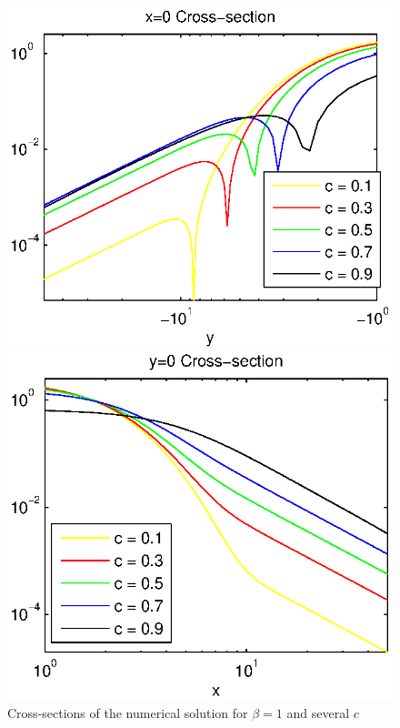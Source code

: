 \documentclass[leqno,11pt]{book}
\begin{document}
\begin{figure}[ht]
\begin{minipage}[b]{0.5\linewidth}
	\end{minipage}
	\begin{minipage}[b]{0.5\linewidth}
		\raggedleft
		\includegraphics[width=\linewidth]{cross-sections/c=01__09beta=1Logx=0.eps}
	\end{minipage}	
	\begin{minipage}[b]{0.5\linewidth}
		\raggedright
		 \includegraphics[width=\linewidth]{cross-sections/c=01__09beta=1Logy=0.eps}
	\end{minipage}
	\caption{Cross-sections of the numerical solution for $\beta=1$ and several  $c$}
	\label{profilesSpeedVarying}
\end{figure}
\end{document}
